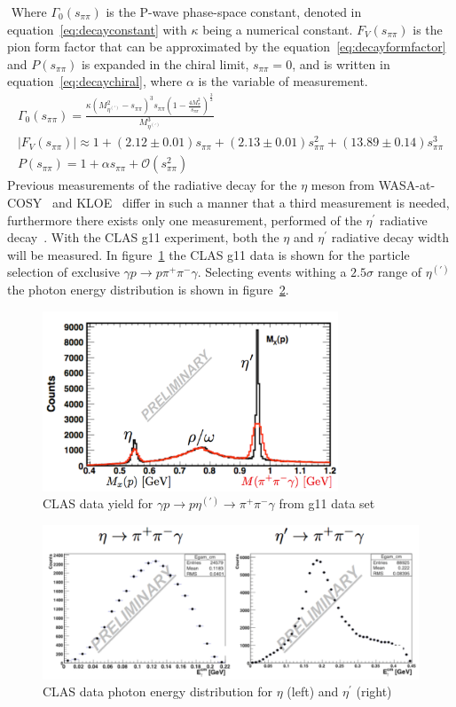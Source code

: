 \documentclass{aip-cp}
\begin{document}
 Where $\Gamma_0(s_{\pi\pi})$ is the P-wave phase-space constant, denoted in equation~\ref{eq:decayconstant} with $\kappa$ being a numerical constant. $F_V(s_{\pi\pi})$ is the pion form factor that can be approximated by the equation~\ref{eq:decayformfactor} and  $P(s_{\pi\pi})$ is expanded in the chiral limit, $s_{\pi\pi} = 0$, and is written in equation~\ref{eq:decaychiral}, where $\alpha$ is the variable of measurement.
\begin{eqnarray}
\Gamma_0(s_{\pi\pi}) = \frac{\kappa \left(M^2_{\eta^{(\prime)}} - s_{\pi\pi} \right)^3  s_{\pi\pi} \left(1- \frac{ 4M^2_{\pi }}{    s_{\pi\pi}  }\right)^{\frac{3}{2}}   }{M^3_{\eta^{(\prime)} }}  \label{eq:decayconstant}  \\
\vert F_V(s_{\pi\pi}) \vert \approx 1+(2.12\pm0.01)s_{\pi\pi} + (2.13\pm0.01)s_{\pi\pi}^2+(13.89\pm0.14)s_{\pi\pi}^3 \label{eq:decayformfactor} \\
P(s_{\pi\pi}) = 1 + \alpha s_{\pi\pi} + \mathcal{O}(s_{\pi\pi}^2) \label{eq:decaychiral}
\end{eqnarray}
Previous measurements of the radiative decay for the $\eta$ meson from WASA-at-COSY~\cite{bib0} and KLOE~\cite{bib3} differ in such a manner that a third measurement is needed, furthermore there exists only one measurement, performed  of the $\eta^{\prime}$ radiative decay~\cite{bib2}. With the CLAS g11 experiment, both the $\eta$ and  $\eta^{\prime}$ radiative decay width will be measured. In figure~\ref{fig:boxCLASdata} the CLAS g11 data is shown for the particle selection of exclusive $\gamma p \to p  \pi^+ \pi^- \gamma $. Selecting events withing a $2.5 \sigma$ range of $\eta^{(\prime)}$ the photon energy distribution is shown in figure~\ref{fig:boxCLAS}. 
\begin{figure}[h]
	\centerline{\includegraphics[width=250pt]{figures/clas_g11data.pdf}}
	\caption{CLAS data yield for $\gamma p \to p \eta^{(\prime)} \to \pi^+ \pi^- \gamma $ from g11 data set }
	\label{fig:boxCLASdata}
\end{figure}
\begin{figure}[h]
	\centerline{\includegraphics[width=350pt]{figures/Box_CLAS.pdf}}
	\caption{CLAS data photon energy distribution for $\eta$ (left) and $\eta^{\prime}$ (right)}
	\label{fig:boxCLAS}
\end{figure}
\end{document}
